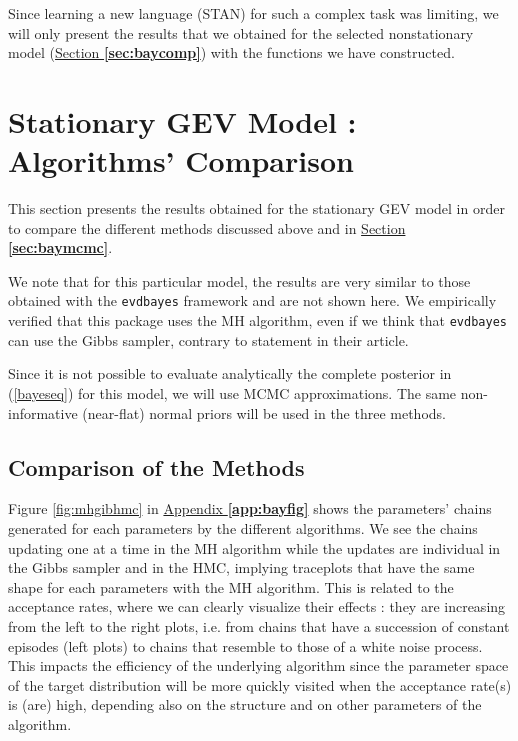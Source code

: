 Since learning a new language (STAN) for such a complex task was limiting, we will only present the results that we obtained for the selected nonstationary model (\hyperref[sec:baycomp]{Section \textbf{\ref{sec:baycomp}}}) with the functions we have constructed.

\section{Stationary GEV Model : Algorithms' Comparison}\label{sec:baystatio}


This section presents the results obtained for the stationary GEV model in order to compare the different methods discussed above and in \hyperref[sec:baymcmc]{Section \textbf{\ref{sec:baymcmc}}}. 

We note that for this particular model, the results are very similar to those obtained with the \texttt{evdbayes} framework and are not shown here. We empirically verified that this package uses the MH algorithm, even if we think that  \texttt{evdbayes} can use the Gibbs sampler, contrary to \citet[pp.6]{hartmann_bayesian_2016} statement in their article.

Since it is not possible to evaluate analytically the complete posterior in (\ref{bayeseq}) for this model, we will use MCMC approximations. The same non-informative (near-flat) normal priors will be used
in the three methods.

\subsection{Comparison of the Methods}


Figure \ref{fig:mhgibhmc} in \hyperref[app:bayfig]{Appendix \textbf{\ref{app:bayfig}}}
shows the parameters' chains generated for each parameters by the different algorithms. 
We see the chains updating one at a time in the MH algorithm while the updates are individual in the Gibbs sampler and in the HMC, implying traceplots that have the same shape for each parameters with the MH algorithm. This is related to the acceptance rates, where we can clearly visualize their effects : they are increasing from the left to the right plots, i.e. from chains that have a succession of constant episodes (left plots) to chains that resemble to those of a white noise process.
This impacts the efficiency of the underlying algorithm since the parameter space of the target distribution will be more quickly visited when the acceptance rate(s) is (are) high, depending also on the structure and on other parameters of the algorithm. 


